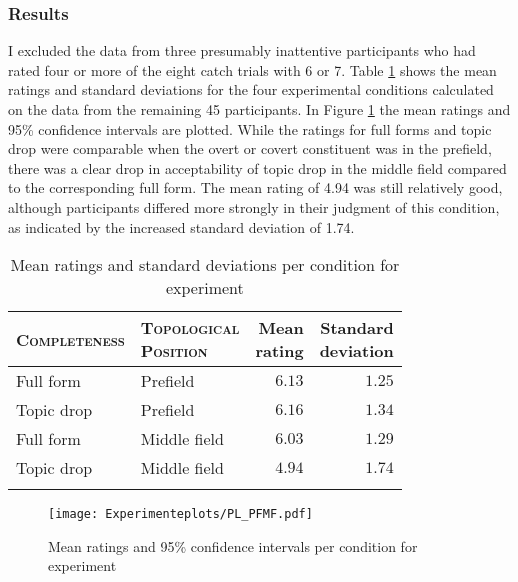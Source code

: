 \subsubsection{Results}\label{sec:exp.pf.mf.results}
I excluded the data from three presumably inattentive participants who had rated four or more of the eight catch trials with 6 or 7.
Table \ref{tab:descriptives.pf.mf} shows the mean ratings and standard deviations for the four experimental conditions calculated on the data from the remaining 45 participants. 
In Figure \ref{fig:pl.pf.mf} the mean ratings and 95\% confidence intervals are plotted.
While the ratings for full forms and topic drop were comparable when the overt or covert constituent was in the prefield, there was a clear drop in acceptability of topic drop in the middle field compared to the corresponding full form.
The mean rating of 4.94 was still relatively good, although participants differed more strongly in their judgment of this condition, as indicated by the increased standard deviation of 1.74.

\begin{table}
\caption{Mean ratings and standard deviations per condition for experiment }
\centering
\begin{tabular}{llrr}
\lsptoprule
\textsc{Completeness} & \Centerstack{\textsc{Topological}\\\textsc{Position}} & \Centerstack{Mean\\rating} & \Centerstack{Standard\\deviation} \\
\midrule
Full form & Prefield & $6.13$ & $1.25$ \\
Topic drop & Prefield & $6.16$ & $1.34$ \\
Full form & Middle field & $6.03$ & $1.29$ \\
Topic drop & Middle field & $4.94$ & $1.74$\\
\lspbottomrule
\end{tabular}
\label{tab:descriptives.pf.mf}
\end{table}

\begin{figure}
\centering
\texttt{[image: Experimenteplots/PL\_PFMF.pdf]}
 \caption{Mean ratings and 95\% confidence intervals per condition for experiment }
\label{fig:pl.pf.mf} %
\end{figure}

